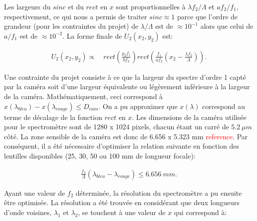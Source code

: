 \documentclass[conference]{IEEEtran}
\begin{document}
Les largeurs du $sinc$ et du $rect$ en $x$ sont proportionnelles à $\lambda f_2/\Lambda$ et $af_2/f_1$, respectivement, ce qui nous
a permis de traiter $sinc\approx1$ parce que l'ordre de grandeur (pour les contraintes du projet) de $\lambda/\Lambda$ est de $\approx10^{-1}$ alors que celui de $a/f_1$ est
de $\approx10^{-2}$. La forme finale de $U_2(x_2,y_2)$ est:

\begin{align*}
    U_2(x_2,y_2)\propto&\ rect(\frac{y_2 f_1}{b f_2})rect(\frac{f_1}{a f_2}(x_2-\frac{\lambda f_2}{\Lambda})).
\end{align*}

Une contrainte du projet consiste à ce que la largeur du spectre d'ordre 1 capté par la caméra
soit d'une largeur équivalente ou légèrement inférieure à la largeur de la caméra. Mathématiquement, ceci correspond à
$x(\lambda_{bleu})-x(\lambda_{rouge})\leq D_{cam}$. On a pu approximer que $x(\lambda)$ correspond au terme de décalage
de la fonction $rect$ en $x$. Les dimensions de la caméra utilisée pour le spectromètre sont de 1280 x 1024 pixels, chacun étant un carré de
$5.2\ \mu m$ côté. La zone sensible de la caméra est donc de 6.656 x 5.323 mm \textcolor{red}{reference}. Par conséquent, il a été nécessaire d'optimiser la relation suivante
en fonction des lentilles disponibles (25, 30, 50 ou 100 mm de longueur focale):

\begin{align*}
    \frac{f_2}{\Lambda}(\lambda_{bleu}-\lambda_{rouge})\leq 6.656\ mm.
\end{align*}

Ayant une valeur de $f_2$ déterminée, la résolution du spectromètre a pu ensuite être optimisée. La résolution a été trouvée en
considérant que deux longueurs d'onde voisines, $\lambda_1$ et $\lambda_2$, se touchent à une valeur de $x$ qui correspond à:
\end{document}
